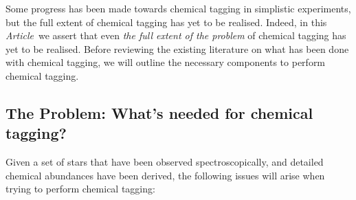 \documentclass{aastex61}
\newcommand{\article}{\emph{Article}}
\begin{document}
Some progress has been made towards chemical tagging in simplistic experiments, 
but the full extent of chemical tagging has yet to be realised. Indeed, in this 
\article\ we assert that even \emph{the full extent of the problem} of chemical 
tagging has yet to be realised. Before reviewing the existing literature on
what has been done with chemical tagging, we will outline the necessary
components to perform chemical tagging.




\subsection{The Problem: What's needed for chemical tagging?}
\label{section:the-problem}

Given a set of stars that have been observed spectroscopically, and detailed
chemical abundances have been derived, the following issues will arise when
trying to perform chemical tagging:
\end{document}
